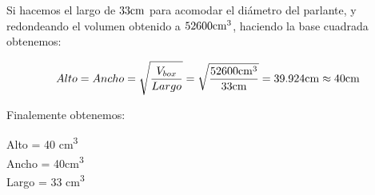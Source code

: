 Si hacemos el largo de $33 \si[per-mode=symbol]{\centi\meter}$ para acomodar el diámetro del parlante, y redondeando el volumen obtenido a $52600 \si[per-mode=symbol]{\cubic\centi\meter}$, haciendo la base cuadrada obtenemos:


\begin{equation*}
Alto = Ancho = \sqrt{\frac{V_{box}}{Largo}} = \sqrt{\frac{52600 \si[per-mode=symbol]{\cubic\centi\meter}}{33 \si[per-mode=symbol]{\centi\meter}}} = 39.924 \si[per-mode=symbol]{\centi\meter} \approx 40 \si[per-mode=symbol]{\centi\meter}
\end{equation*}

Finalemente obtenemos:


\begin{mymathbox}[ams align*, title=Dimensiones de la caja (método de suspensión acústica), colframe=EQColor!30!EQColor]
Alto = 40 \si[per-mode=symbol]{\cubic\centi\meter} \\
Ancho = 40\si[per-mode=symbol]{\cubic\centi\meter} \\
Largo = 33 \si[per-mode=symbol]{\cubic\centi\meter}
\end{mymathbox}







